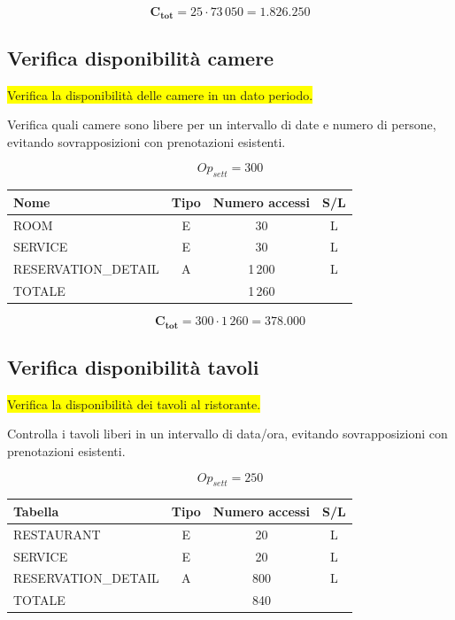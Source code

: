 \documentclass[a4paper,12pt]{report}
\begin{document}
$$\mathbf{C_{tot}} = 25 \cdot 73\,050 = \mathbf{1.826.250}$$

\subsection*{Verifica disponibilità camere} \label{op7}
\colorbox{yellow}{Verifica la disponibilità delle camere in un dato periodo.}

Verifica quali camere sono libere per un intervallo di date e numero
di persone, evitando sovrapposizioni con prenotazioni esistenti.

$$Op_{sett} = 300$$

\begin{table}[H]
  \centering
  \small
  \renewcommand{\arraystretch}{1.15}
  \begin{tabularx}{0.8\textwidth}{|X|c|c|c|}
    \hline
    \rowcolor{gray!20}
    \textbf{Nome} & \textbf{Tipo} & \textbf{Numero accessi} &
    \textbf{S/L} \\
    \hline
    ROOM & E & 30 & L \\
    SERVICE & E & 30 & L \\
    RESERVATION\_DETAIL & A & 1\,200 & L \\
    \hline
    \rowcolor{gray!20}
    TOTALE & & 1\,260 & \\
    \hline
  \end{tabularx}
  \vspace{-1em}
\end{table}

$$\mathbf{C_{tot}} = 300 \cdot 1\,260 = \mathbf{378.000}$$

\subsection*{Verifica disponibilità tavoli} \label{op8}
\colorbox{yellow}{Verifica la disponibilità dei tavoli al ristorante.}

Controlla i tavoli liberi in un intervallo di data/ora, evitando
sovrapposizioni con prenotazioni esistenti.

$$Op_{sett} = 250$$

\begin{table}[H]
  \centering
  \small
  \renewcommand{\arraystretch}{1.15}
  \begin{tabularx}{0.8\textwidth}{|X|c|c|c|}
    \hline
    \rowcolor{gray!20}
    \textbf{Tabella} & \textbf{Tipo} & \textbf{Numero accessi} & \textbf{S/L} \\
    \hline
    RESTAURANT & E & 20 & L \\
    SERVICE & E & 20 & L \\
    RESERVATION\_DETAIL & A & 800 & L \\
    \hline
    \rowcolor{gray!20}
    TOTALE & & 840 & \\
    \hline
  \end{tabularx}
  \vspace{-1em}
\end{table}
\end{document}

